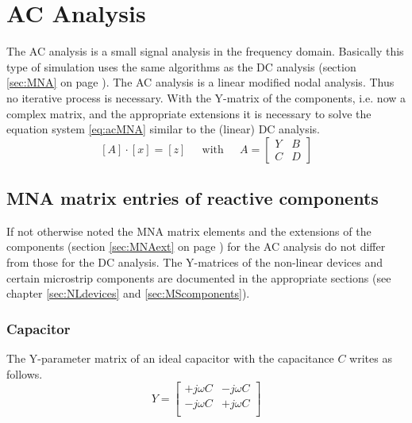 %
%

\chapter{AC Analysis}

The AC analysis is a small signal analysis in the frequency domain.
Basically this type of simulation uses the same algorithms as the DC
analysis (section \ref{sec:MNA} on page \pageref{sec:MNA}).  The AC
analysis is a linear modified nodal analysis.  Thus no iterative
process is necessary.  With the Y-matrix of the components, i.e. now a
complex matrix, and the appropriate extensions it is necessary to
solve the equation system \eqref{eq:acMNA} similar to the (linear) DC
analysis.
\begin{equation}
\label{eq:acMNA}
\left[A\right] \cdot \left[x\right] = \left[z\right]
\;\;\;\; \textrm{ with } \;\;\;\;
A =
\begin{bmatrix}
Y & B\\
C & D
\end{bmatrix}
\end{equation}

\section{MNA matrix entries of reactive components}

If not otherwise noted the MNA matrix elements and the extensions of
the components (section \ref{sec:MNAext} on page \pageref{sec:MNAext})
for the AC analysis do not differ from those for the DC analysis.  The
Y-matrices of the non-linear devices and certain microstrip components
are documented in the appropriate sections (see chapter
\ref{sec:NLdevices} and \ref{sec:MScomponents}).

\subsection{Capacitor}

The Y-parameter matrix of an ideal capacitor with the capacitance $C$
writes as follows.
\begin{equation}
Y =
\begin{bmatrix}
+j\omega C & -j\omega C\\
-j\omega C & +j\omega C\\
\end{bmatrix}
\end{equation}

